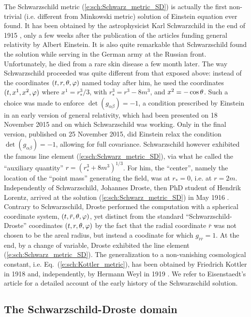 \begin{hist}
The Schwarzschild metric (\ref{e:sch:Schwarz_metric_SD}) is actually
the first non-trivial (i.e. different from Minkowski metric) solution
of Einstein equation ever found. It has been obtained by the
astrophysicist Karl Schwarzchild in the end of 1915 \cite{Schwa1916}, only a few weeks
after the publication of the articles funding general relativity by
Albert Einstein. It is also quite remarkable that
Schwarzschild found the solution while serving in the German army at the Russian
front. Unfortunately, he died from a rare skin disease a few month later.
The way Schwarzschild proceeded was quite different from that exposed above:
instead of the coordinates $(t,r,\theta,\varphi)$
named today after him, he used the coordinates
$(t,x^1,x^2,\varphi)$ where $x^1 = r_*^3/3$, with $r_*^3 = r^3-8m^3$, and
$x^2 = -\cos\theta$. Such a choice was made to enforce $\det(g_{\alpha\beta}) = -1$, a condition
prescribed by Einstein in an early version of general relativity, which had been presented on
18 November 2015 and on which Schwarzschild was working. Only in the final version, published on
25 November 2015, did Einstein relax the condition $\det(g_{\alpha\beta}) = -1$, allowing for full
covariance. Schwarzschild however
exhibited the famous line element (\ref{e:sch:Schwarz_metric_SD}), via what he
called the ``auxiliary quantity'' $r = (r_*^3 + 8m^3)^{1/3}$.
For him, the ``center'',  namely the location of the ``point mass'' generating the field,
was at $r_* = 0$, i.e. at $r=2m$.
Independently of Schwarzschild, Johannes Droste, then PhD student of
Hendrik Lorentz,
arrived at the solution (\ref{e:sch:Schwarz_metric_SD}) in May 1916 \cite{Drost1917}.
Contrary to Schwarzschild, Droste performed the computation with
a spherical coordinate system, $(t,\bar r, \theta,\varphi)$, yet distinct from
the standard ``Schwarzschild-Droste'' coordinates $(t,r,\theta,\varphi)$ by the fact that the radial
coordinate $\bar r$ was not chosen to be the areal radius, but instead a
coodinate for which $g_{\bar r\bar r} = 1$. At the end, by a change of
variable, Droste exhibited the line element (\ref{e:sch:Schwarz_metric_SD}).
The generalization to a non-vanishing cosmological constant, i.e.
Eq.~(\ref{e:sch:Kottler_metric}), has been obtained by
Friedrich Kottler in 1918 \cite{Kottl1918} and, independently, by
Hermann Weyl in 1919 \cite{Weyl1919}. We refer to Eisenstaedt's article
\cite{Eisen82} for a detailed account of the early history of the
Schwarzschild solution.
\end{hist}


\subsection{The Schwarzschild-Droste domain} \label{s:sch:SD_domain}

